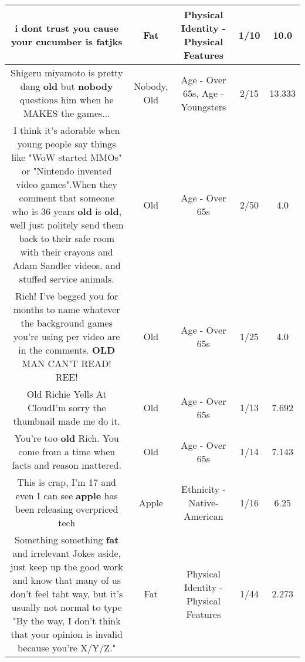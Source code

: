 \documentclass[11pt]{article}
\newlength\mylength
\begin{document}
\begin{center}
\begin{longtable}{|C{.65\mylength}|C{.30\mylength}|C{.12\mylength}|C{.12\mylength}|C{.12\mylength}|}
  \small i dont trust you cause your cucumber is \textbf{fat}jks\normalsize   & Fat & Physical Identity - Physical Features & 1/10 & 10.0 \\  \hline
  \small Shigeru miyamoto is pretty dang \textbf{old} but \textbf{nobody} questions him when he MAKES the games...\normalsize   & Nobody, Old & Age - Over 65s, Age - Youngsters & 2/15 & 13.333 \\  \hline
  \small I think it's adorable when young people say things like "WoW started MMOs" or "Nintendo invented video games".When they comment that someone who is 36 years \textbf{old} is \textbf{old}, well just politely send them back to their safe room with their crayons and Adam Sandler videos, and stuffed service animals.\normalsize   & Old & Age - Over 65s & 2/50 & 4.0 \\  \hline
  \small Rich! I've begged you for months to name whatever the background games you're using per video are in the comments. \textbf{OLD} MAN CAN'T READ! REE!\normalsize   & Old & Age - Over 65s & 1/25 & 4.0 \\  \hline
  \small Old Richie Yells At CloudI'm sorry the thumbnail made me do it.\normalsize   & Old & Age - Over 65s & 1/13 & 7.692 \\  \hline
  \small You're too \textbf{old} Rich. You come from a time when facts and reason mattered.\normalsize   & Old & Age - Over 65s & 1/14 & 7.143 \\  \hline
  \small This is crap, I'm 17 and even I can see \textbf{apple} has been releasing overpriced tech\normalsize   & Apple & Ethnicity - Native-American & 1/16 & 6.25 \\  \hline
  \small Something something \textbf{fat} and irrelevant Jokes aside, just keep up the good work and know that many of us don't feel taht way, but it's usually not normal to type "By the way, I don't think that your opinion is invalid because you're X/Y/Z."\normalsize   & Fat & Physical Identity - Physical Features & 1/44 & 2.273 \\  \hline

\end{longtable}
\end{center}
\end{document}

